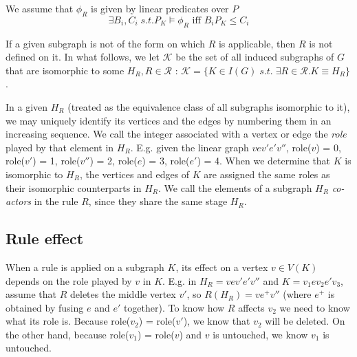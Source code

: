 \documentclass[11pt, oneside, reqno]{article}
\newcommand{\Kc}{\mathcal{K}}
\newcommand{\Ne}{\mathbb{N}}
\newcommand{\Rc}{\mathcal{R}}
\begin{document}
We assume that $\phi_R$ is given by linear predicates over $P$
\begin{equation}
\label{eq:formOfPhi}
\exists B_i, C_i\; s.t. P_K \models \phi_R \textrm{ iff } B_i P_K \leq C_i
\end{equation}

If a given subgraph is not of the form on which $R$ is applicable, then $R$ is not defined on it.
In what follows, we let $\Kc$ be the set of all induced subgraphs of $G$ that are isomorphic to some $H_{R}, R \in \Rc$ : $\Kc = \{K \in I(G) \; s.t. \; \exists R \in \Rc . K \equiv H_R\}$.

In a given $H_R$ (treated as the equivalence class of all subgraphs isomorphic to it), we may uniquely identify its vertices and the edges by numbering them in an increasing sequence.
We call the integer associated with a vertex or edge the \emph{role} played by that element in $H_R$.
E.g. given the linear graph $v e v' e' v''$, 
role($v$) = 0, role($v'$) = 1, role($v''$) = 2, role($e$) = 3, role($e'$) = 4.
When we determine that $K$ is isomorphic to $H_R$, the vertices and edges of $K$ are assigned the same roles as their isomorphic counterparts in $H_R$.
We call the elements of a subgraph $H_R$ \emph{co-actors} in the rule $R$, since they share the same stage $H_R$.


\subsection{Rule effect}
\label{ruleEffect}
When a rule is applied on a subgraph $K$, its effect on a vertex $v \in V(K)$ depends on the role played by $v$ in $K$. 
E.g. in $H_R = v e v' e' v''$ and $K = v_1 e v_2 e' v_3$, assume that $R$ deletes the middle vertex $v'$, so $R(H_R) =  v e^+ v''$ (where $e^+$ is obtained by fusing $e$ and $e'$ together).
To know how $R$ affects $v_2$ we need to know what its role is.
Because role($v_2$) = role($v'$), we know that $v_2$ will be deleted. 
On the other hand, because role($v_1$) = role($v$) and $v$ is untouched, we know $v_1$ is untouched.
\end{document}
